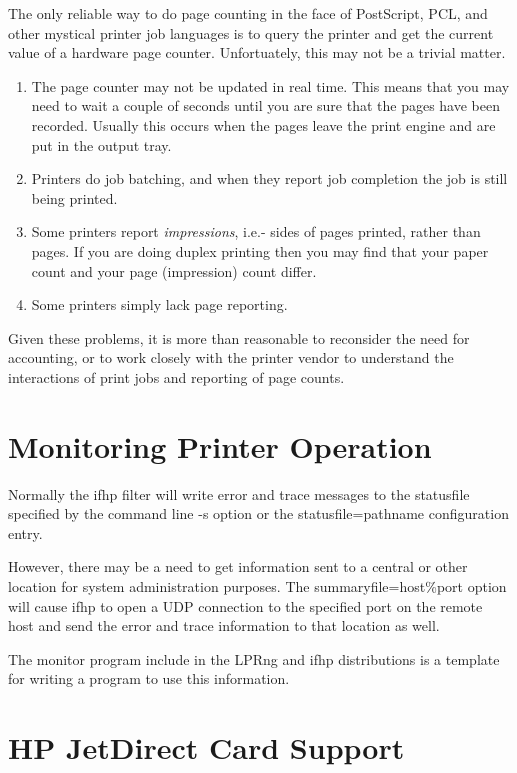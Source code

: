\documentclass[a4paper]{article}
\begin{document}
The only reliable way to do page counting in the face of
PostScript,
PCL,
and other mystical printer job languages is to query the printer
and get the current value of a hardware page counter.
Unfortuately,
this may not be a trivial matter.
\begin{enumerate}
\item The page counter may not be updated in real time.
This means that you may need to wait a couple of seconds until you are
sure that the pages have been recorded.
Usually this occurs when the pages leave the print engine
and are put in the output tray.
\item Printers do job batching,
and when they report job completion the job is still being printed.
\item Some printers report
{\itshape impressions\/},
i.e.- sides of pages printed,
rather than pages.
If you are doing duplex printing then you may find that your
paper count and your page (impression) count differ.
\item Some printers simply lack page reporting.
\end{enumerate}


Given these problems,
it is more than reasonable to reconsider the need for accounting,
or to work closely with the printer vendor to understand the
interactions of print jobs and reporting of page counts.


\section{Monitoring Printer Operation}

Normally the
{\ttfamily ifhp}
filter will write error and trace messages to the
{\ttfamily statusfile}
specified by the command line
{\ttfamily -s}
option or the
{\ttfamily statusfile=pathname}
configuration entry.

However,
there may be a need to get information sent to a central or other
location for system administration purposes.
The
{\ttfamily summaryfile=host\%port}
option will cause {\ttfamily ifhp} to  open a UDP connection 
to the specified port on the remote host and send the error and
trace information to that location as well.

The
{\ttfamily monitor}
program include in the LPRng
and {\ttfamily ifhp}
distributions is a template for writing a program to use
this information.


\section{HP JetDirect Card Support}
\end{document}
